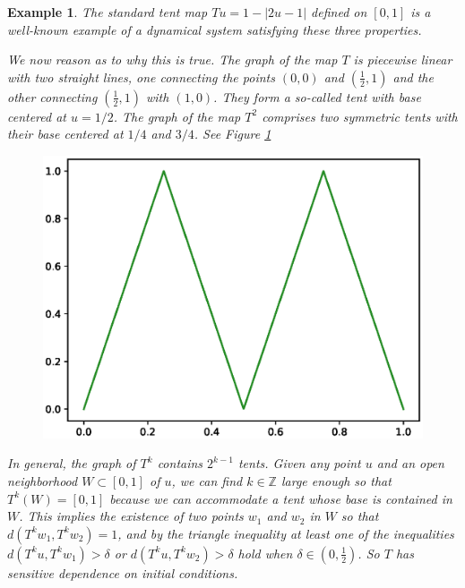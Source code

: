 \documentclass[a4paper,12pt,twoside]{report}
\newtheorem{Example}{Example}[]
\begin{document}
\begin{Example} 
  The standard tent map $Tu=1-|2u-1|$ defined on $[0,1]$ is a well-known example of a dynamical system satisfying these three properties. 

  We now reason as to why this is true. The graph of the map $T$ is piecewise linear with two straight lines, one connecting the points $(0,0)$ and $(\frac{1}{2},1)$ and the other connecting $(\frac{1}{2},1)$ with $(1,0)$. They form a so-called tent with base centered at $u=1/2$. The graph of the map $T^2$ comprises two symmetric tents with their base centered at $1/4$ and $3/4$. See Figure \ref{fig:T2tentmap}

  \begin{figure}[ht]
    \includegraphics[scale=0.6]{_tentmap_2.eps}
        \centering
        \label{fig:T2tentmap}
  \end{figure}
  
  In general, the graph of  $T^k$ contains $2^{k-1}$ tents.
  Given any point $u$ and an open neighborhood $W \subset[0,1]$ of $u$, we can find $k\in\mathbb{Z}$ large enough so that $T^k(W) = [0,1]$ because we can accommodate a tent whose base is contained in $W$. %
  This implies the existence of two points $w_1$ and $w_2$ in $W$ so that $d(T^kw_1,T^kw_2)= 1$, and by the triangle inequality  at least one of the inequalities $d(T^ku,T^kw_1)> \delta$ or $d(T^ku,T^kw_2)> \delta$ hold when $\delta\in (0,\frac{1}{2})$.  So $T$ has sensitive dependence on initial conditions.
  

\end{Example}
\end{document}
